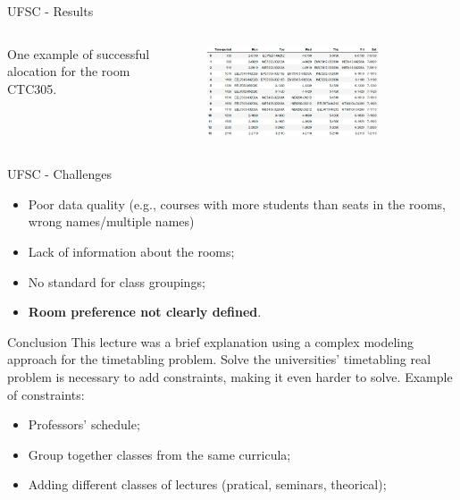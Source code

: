 \documentclass{beamer}
\begin{document}
\begin{frame}{UFSC - Results}

	 \begin{columns}[c]
        \begin{column}{.3\textwidth}
    
    	One example of successful alocation for the room CTC305.
    
        \end{column}
        \begin{column}{.7\textwidth}
    
    	\begin{figure}[h]
    	    \centering
    	    \includegraphics[width=0.8\textwidth]{figures/timetable_result.jpeg}
    	\end{figure}
    
        \end{column}
    \end{columns}

\end{frame}

\begin{frame}{UFSC - Challenges}
    \begin{itemize}
	\item Poor data quality (e.g., courses with more students than seats in the rooms, wrong names/multiple names)
	\item Lack of information about the rooms;
	\item No standard for class groupings;
	\item \textbf{Room preference not clearly defined}.
    \end{itemize}
\end{frame}

\begin{frame}{Conclusion}
This lecture was a brief explanation using a complex modeling approach for the timetabling problem. Solve the universities' timetabling real problem is necessary to add constraints, making it even harder to solve. 
Example of constraints:
    \begin{itemize}
        \item Professors' schedule;
        \item Group together classes from the same curricula;
        \item Adding different classes of lectures (pratical, seminars, theorical);
    \end{itemize}
    

\end{frame}
\end{document}
